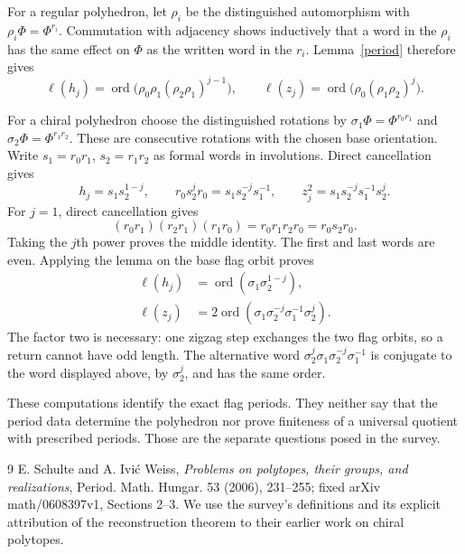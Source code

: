 \documentclass[11pt,a4paper]{article}
\begin{document}
For a regular polyhedron, let $\rho_i$ be the distinguished
automorphism with $\rho_i\Phi=\Phi^{r_i}$. Commutation with adjacency
shows inductively that a word in the $\rho_i$ has the same effect on
$\Phi$ as the written word in the $r_i$. Lemma~\ref{period} therefore
gives
\[
 \ell(h_j)=\operatorname{ord}\bigl(\rho_0\rho_1
                (\rho_2\rho_1)^{j-1}\bigr),\qquad
 \ell(z_j)=\operatorname{ord}\bigl(\rho_0(\rho_1\rho_2)^j\bigr).
\]

For a chiral polyhedron choose the distinguished rotations by
$\sigma_1\Phi=\Phi^{r_0r_1}$ and
$\sigma_2\Phi=\Phi^{r_1r_2}$. These are consecutive rotations with the
chosen base orientation. Write $s_1=r_0r_1$, $s_2=r_1r_2$ as formal
words in involutions. Direct cancellation gives
\[
 h_j=s_1s_2^{1-j},\qquad
 r_0s_2^jr_0=s_1s_2^{-j}s_1^{-1},\qquad
 z_j^2=s_1s_2^{-j}s_1^{-1}s_2^j.
\]
For $j=1$, direct cancellation gives
\[
 (r_0r_1)(r_2r_1)(r_1r_0)=r_0r_1r_2r_0=r_0s_2r_0.
\]
Taking the $j$th power proves the middle identity.
The first and last words are even. Applying the lemma on the base
flag orbit proves
\begin{align*}
 \ell(h_j)&=\operatorname{ord}(\sigma_1\sigma_2^{1-j}),\\
 \ell(z_j)&=2\operatorname{ord}
       (\sigma_1\sigma_2^{-j}\sigma_1^{-1}\sigma_2^j).
\end{align*}
The factor two is necessary: one zigzag step exchanges the two flag
orbits, so a return cannot have odd length. The alternative word
$\sigma_2^j\sigma_1\sigma_2^{-j}\sigma_1^{-1}$ is conjugate to the
word displayed above, by $\sigma_2^j$, and has the same order.

These computations identify the exact flag periods. They neither say
that the period data determine the polyhedron nor prove finiteness of
a universal quotient with prescribed periods. Those are the separate
questions posed in the survey.

\begin{thebibliography}{9}\small
{} E. Schulte and A. Ivi\'c Weiss,
\emph{Problems on polytopes, their groups, and realizations},
Period. Math. Hungar. 53 (2006), 231--255; fixed arXiv math/0608397v1,
Sections 2--3. We use the survey's definitions and its explicit attribution
of the reconstruction theorem to their earlier work on chiral polytopes.
\end{thebibliography}
\end{document}
